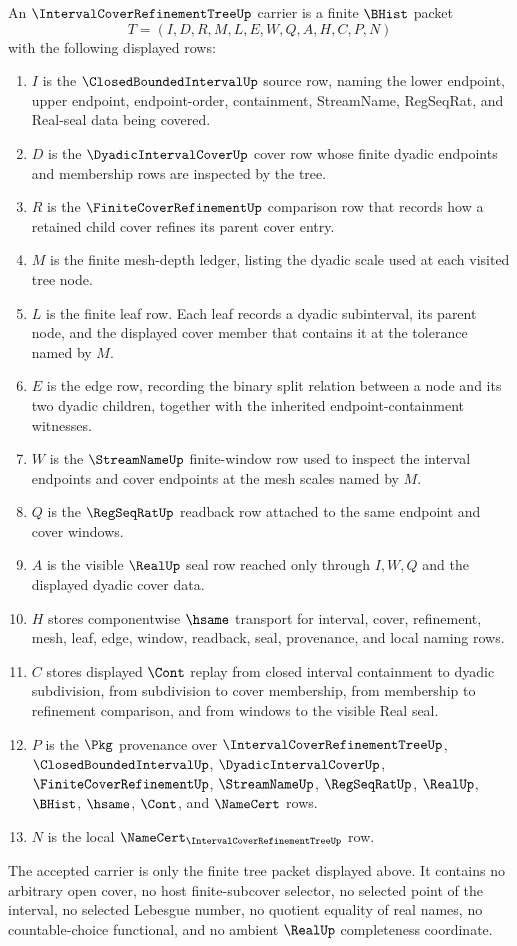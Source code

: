 \begin{definition}
\label{def:interval-cover-refinement-tree-carrier}
An $\IntervalCoverRefinementTreeUp$ carrier is a finite $\BHist$ packet
$$
T=(I,D,R,M,L,E,W,Q,A,H,C,P,N)
$$
with the following displayed rows:
\begin{enumerate}
\item $I$ is the $\ClosedBoundedIntervalUp$ source row, naming the lower endpoint, upper endpoint, endpoint-order, containment, StreamName, RegSeqRat, and Real-seal data being covered.
\item $D$ is the $\DyadicIntervalCoverUp$ cover row whose finite dyadic endpoints and membership rows are inspected by the tree.
\item $R$ is the $\FiniteCoverRefinementUp$ comparison row that records how a retained child cover refines its parent cover entry.
\item $M$ is the finite mesh-depth ledger, listing the dyadic scale used at each visited tree node.
\item $L$ is the finite leaf row. Each leaf records a dyadic subinterval, its parent node, and the displayed cover member that contains it at the tolerance named by $M$.
\item $E$ is the edge row, recording the binary split relation between a node and its two dyadic children, together with the inherited endpoint-containment witnesses.
\item $W$ is the $\StreamNameUp$ finite-window row used to inspect the interval endpoints and cover endpoints at the mesh scales named by $M$.
\item $Q$ is the $\RegSeqRatUp$ readback row attached to the same endpoint and cover windows.
\item $A$ is the visible $\RealUp$ seal row reached only through $I,W,Q$ and the displayed dyadic cover data.
\item $H$ stores componentwise $\hsame$ transport for interval, cover, refinement, mesh, leaf, edge, window, readback, seal, provenance, and local naming rows.
\item $C$ stores displayed $\Cont$ replay from closed interval containment to dyadic subdivision, from subdivision to cover membership, from membership to refinement comparison, and from windows to the visible Real seal.
\item $P$ is the $\Pkg$ provenance over $\IntervalCoverRefinementTreeUp$, $\ClosedBoundedIntervalUp$, $\DyadicIntervalCoverUp$, $\FiniteCoverRefinementUp$, $\StreamNameUp$, $\RegSeqRatUp$, $\RealUp$, $\BHist$, $\hsame$, $\Cont$, and $\NameCert$ rows.
\item $N$ is the local $\NameCert_{\IntervalCoverRefinementTreeUp}$ row.
\end{enumerate}
The accepted carrier is only the finite tree packet displayed above. It contains no arbitrary open cover, no host finite-subcover selector, no selected point of the interval, no selected Lebesgue number, no quotient equality of real names, no countable-choice functional, and no ambient $\RealUp$ completeness coordinate.
\end{definition}
